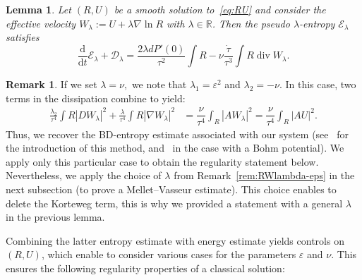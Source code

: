\documentclass[11pt]{article}
\newtheorem{lemm}[theo]{Lemma}
\theoremstyle{definition}
\newtheorem{rema}[theo]{Remark}
\numberwithin{equation}{section}
\numberwithin{figure}{section}
\numberwithin{table}{section}
\DeclareMathOperator{\DIV}{div}
\newcommand*\dd {\mathrm{d}}
\newcommand*\<{\left\langle}
\renewcommand*\>{\right\rangle}
\begin{document}
\begin{lemm}\label{lem:pseudo-lambda-entropy}
Let $(R,U)$ be a smooth solution to~\eqref{eq:RU} and consider the effective velocity $W_\lambda := U + \lambda \nabla \ln R$ with $\lambda \in \mathbb R$. Then the pseudo $\lambda$-entropy $\mathcal E_{\lambda}$ satisfies
\[
\frac{\dd }{\dd t} \mathcal E_{\lambda} + \mathcal D_{\lambda} = \frac{2 \lambda d P'(0)}{\tau^2} \int R - \nu \frac{\dot \tau}{\tau^3} \int R \DIV W_\lambda.
\]
\end{lemm}

\begin{rema}
If we set $\lambda = \nu,$ we note that $\lambda_1 = \varepsilon^2$ and $\lambda_2=-\nu.$ In this case, two terms in the dissipation combine to yield:
\[
\begin{aligned}
\frac{\lambda_2}{\tau^4} \int R |D W_\lambda|^2 +
\frac{\lambda}{\tau^4} \int R |\nabla W_\lambda|^2 & = \dfrac{\nu}{\tau^4} \int_{R} |A W_{\lambda}|^2 = \dfrac{\nu}{\tau^4} \int_{R} |A U|^2.
\end{aligned}
\]
Thus, we recover the BD-entropy estimate associated with our system (see~\cite{BD04,Bre-De-CKL-03} for the introduction of this method, and~\cite{VasseurYu} in the case with a Bohm potential). We apply only this particular case to obtain the regularity statement below. Nevertheless, we apply the choice of $\lambda$ from Remark~\ref{rem:RWlambda-eps} in the next subsection (to prove a Mellet--Vasseur estimate). This choice enables to delete the Korteweg term, this is why we provided a statement with a general $\lambda$ in the previous lemma.
\end{rema}

Combining the latter entropy estimate with energy estimate yields controls on $(R,U)$, which enable to consider various cases for the parameters $\varepsilon$ and $\nu.$ This ensures the following regularity properties of a classical solution:
\end{document}

